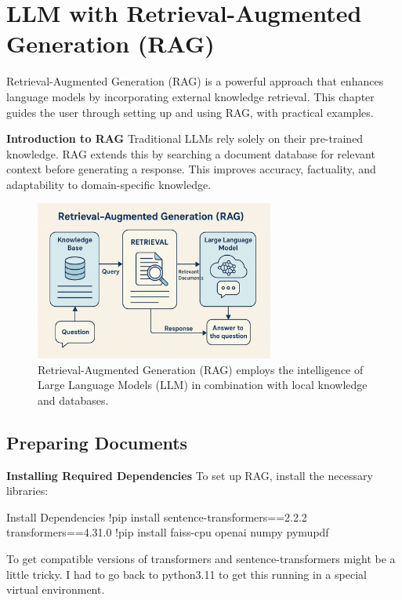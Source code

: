 
\chapter{LLM with Retrieval-Augmented Generation (RAG)}
Retrieval-Augmented Generation (RAG) is a powerful approach that enhances language models by incorporating external knowledge retrieval. This chapter guides the user through setting up and using RAG, with practical examples.

{\bf Introduction to RAG}
Traditional LLMs rely solely on their pre-trained knowledge. RAG extends this by searching a document database for relevant context before generating a response. This improves accuracy, factuality, and adaptability to domain-specific knowledge.

\begin{figure}[ht]
    \centering
    \includegraphics[width=0.7\textwidth]{images/RAG.png}
    \caption{Retrieval-Augmented Generation (RAG) employs the intelligence of Large Language Models (LLM) in combination with local knowledge and databases.}
    \label{fig:vectordb_out}
\end{figure}

%
\section{Preparing Documents}


{\bf Installing Required Dependencies}
To set up RAG, install the necessary libraries:

\begin{codeonly}{Install Dependencies}
!pip install sentence-transformers==2.2.2 transformers==4.31.0
!pip install faiss-cpu openai numpy pymupdf
\end{codeonly}
To get compatible versions of transformers and sentence-transformers might be a little tricky. I had to go back to python3.11 to get this running in a special virtual environment. 

